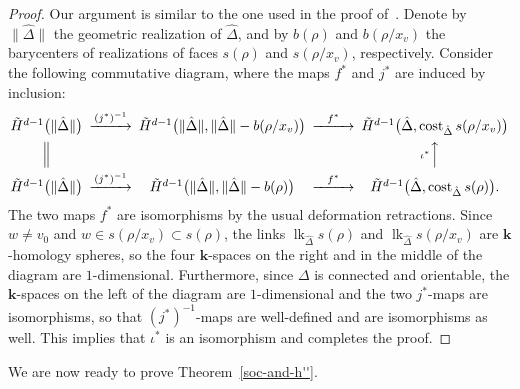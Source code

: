 \documentclass[ALCO,ThmDefs,Unicode,epreuves]{cedram}
\DeclareMathOperator\lk{lk}
\DeclareMathOperator\cost{cost}
\newcommand{\complet}[1]{\hat{#1}}
\newcommand{\field}{\mathbf{k}}
\begin{document}
\begin{proof}
Our argument is similar to the one used in the proof of~\cite[Theorem~2.1]{Novik-Swartz-09:Gorenstein}. Denote by $\|\complet{\Delta}\|$ the geometric realization of $\complet{\Delta}$, and by $b(\rho)$ and $b(\rho/x_v)$ the barycenters of realizations of faces $s(\rho)$ and $s(\rho/x_v)$, respectively. Consider the following commutative diagram, where the maps $f^\ast$ and $j^\ast$ are induced by inclusion:
\[
\begin{CD}
\tilde{H}^{d-1}\big(\|\complet{\Delta}\|\big) @>(j^\ast)^{-1}>> 
\tilde{H}^{d-1}\big(\|\complet{\Delta}\|, \|\complet{\Delta}\| - b(\rho/x_v)\big)
 @>f^\ast>> \tilde{H}^{d-1}\big(\complet{\Delta}, \cost_{\complet{\Delta}}s(\rho/x_v)\big) \\
 @| @. @A\iota^\ast AA \\
 \tilde{H}^{d-1}\big(\|\complet{\Delta}\|\big) @>(j^\ast)^{-1}>> 
\tilde{H}^{d-1}\big(\|\complet{\Delta}\|, \|\complet{\Delta}\| - b(\rho)\big) 
@>f^\ast>> \tilde{H}^{d-1}\big(\complet{\Delta}, \cost_{\complet{\Delta}}s(\rho)\big). 
\end{CD}
\]
The two maps $f^\ast$ are isomorphisms by the usual deformation retractions. Since $w\neq v_0$ and $w\in s(\rho/x_v) \subset s(\rho)$, the links $\lk_{\complet{\Delta}} s(\rho)$ and $\lk_{\complet{\Delta}} s(\rho/x_v)$ are $\field$-homology spheres, so the four $\field$-spaces on the right and in the middle of the diagram are $1$-dimensional. Furthermore, since $\Delta$ is connected and orientable, the $\field$-spaces on the left of the diagram are $1$-dimensional and the two $j^\ast$-maps are isomorphisms, so that $(j^\ast)^{-1}$-maps are well-defined and are isomorphisms as well. This implies that $\iota^\ast$ is an isomorphism and completes the proof.
\end{proof}

We are now ready to prove Theorem~\ref{soc-and-h''}.
\end{document}
